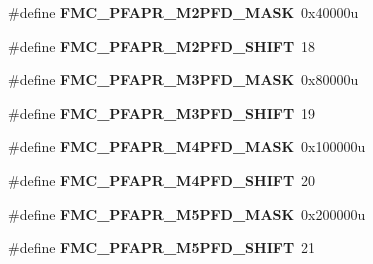 \begin{DoxyCompactItemize}
\item 
\#define {\bfseries F\+M\+C\+\_\+\+P\+F\+A\+P\+R\+\_\+\+M2\+P\+F\+D\+\_\+\+M\+A\+SK}~0x40000u\hypertarget{group__FMC__Register__Masks_ga25320b4377f5b7137bece86c278122a4}{}\label{group__FMC__Register__Masks_ga25320b4377f5b7137bece86c278122a4}

\item 
\#define {\bfseries F\+M\+C\+\_\+\+P\+F\+A\+P\+R\+\_\+\+M2\+P\+F\+D\+\_\+\+S\+H\+I\+FT}~18\hypertarget{group__FMC__Register__Masks_ga52792f2b60fa3fef0d38b172867adfe9}{}\label{group__FMC__Register__Masks_ga52792f2b60fa3fef0d38b172867adfe9}

\item 
\#define {\bfseries F\+M\+C\+\_\+\+P\+F\+A\+P\+R\+\_\+\+M3\+P\+F\+D\+\_\+\+M\+A\+SK}~0x80000u\hypertarget{group__FMC__Register__Masks_ga7ec6298e08ea7c43a5233d895ebb3c06}{}\label{group__FMC__Register__Masks_ga7ec6298e08ea7c43a5233d895ebb3c06}

\item 
\#define {\bfseries F\+M\+C\+\_\+\+P\+F\+A\+P\+R\+\_\+\+M3\+P\+F\+D\+\_\+\+S\+H\+I\+FT}~19\hypertarget{group__FMC__Register__Masks_ga0de5ac6c72c9bc67057f028f4a946539}{}\label{group__FMC__Register__Masks_ga0de5ac6c72c9bc67057f028f4a946539}

\item 
\#define {\bfseries F\+M\+C\+\_\+\+P\+F\+A\+P\+R\+\_\+\+M4\+P\+F\+D\+\_\+\+M\+A\+SK}~0x100000u\hypertarget{group__FMC__Register__Masks_gaa1b82d16461f952ac2b92896f79059a3}{}\label{group__FMC__Register__Masks_gaa1b82d16461f952ac2b92896f79059a3}

\item 
\#define {\bfseries F\+M\+C\+\_\+\+P\+F\+A\+P\+R\+\_\+\+M4\+P\+F\+D\+\_\+\+S\+H\+I\+FT}~20\hypertarget{group__FMC__Register__Masks_gaf06886cc4a8e2d455cef47f111ac8a4b}{}\label{group__FMC__Register__Masks_gaf06886cc4a8e2d455cef47f111ac8a4b}

\item 
\#define {\bfseries F\+M\+C\+\_\+\+P\+F\+A\+P\+R\+\_\+\+M5\+P\+F\+D\+\_\+\+M\+A\+SK}~0x200000u\hypertarget{group__FMC__Register__Masks_ga4ac647b6c05fcd080c70febe293bd169}{}\label{group__FMC__Register__Masks_ga4ac647b6c05fcd080c70febe293bd169}

\item 
\#define {\bfseries F\+M\+C\+\_\+\+P\+F\+A\+P\+R\+\_\+\+M5\+P\+F\+D\+\_\+\+S\+H\+I\+FT}~21\hypertarget{group__FMC__Register__Masks_ga1efe3150392c8b3b9e4f42ec43bfef39}{}\label{group__FMC__Register__Masks_ga1efe3150392c8b3b9e4f42ec43bfef39}


\end{DoxyCompactItemize}
